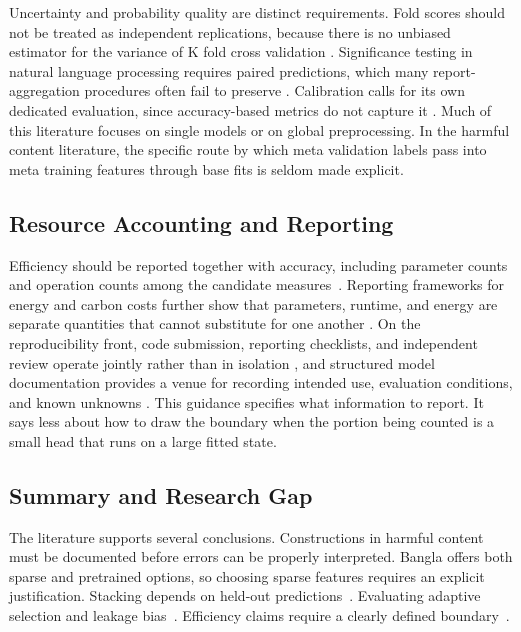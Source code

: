 \documentclass[runningheads]{llncs}
\begin{document}
Uncertainty and probability quality are distinct requirements. Fold scores should not be treated as independent replications, because there is no unbiased estimator for the variance of K fold cross validation . Significance testing in natural language processing requires paired predictions, which many report-aggregation procedures often fail to preserve . Calibration calls for its own dedicated evaluation, since accuracy-based metrics do not capture it . Much of this literature focuses on single models or on global preprocessing. In the harmful content literature, the specific route by which meta validation labels pass into meta training features through base fits is seldom made explicit.

\subsection{Resource Accounting and Reporting}
\label{sec:rw-accounting}

Efficiency should be reported together with accuracy, including parameter counts and operation counts among the candidate measures~\cite{schwartz2020greenai}. Reporting frameworks for energy and carbon costs further show that parameters, runtime, and energy are separate quantities that cannot substitute for one another . On the reproducibility front, code submission, reporting checklists, and independent review operate jointly rather than in isolation , and structured model documentation provides a venue for recording intended use, evaluation conditions, and known unknowns . This guidance specifies what information to report. It says less about how to draw the boundary when the portion being counted is a small head that runs on a large fitted state.

\subsection{Summary and Research Gap}
\label{sec:rw-summary}

The literature supports several conclusions. Constructions in harmful content must be documented before errors can be properly interpreted. Bangla offers both sparse and pretrained options, so choosing sparse features requires an explicit justification. Stacking depends on held-out predictions~\cite{wolpert1992stacked}. Evaluating adaptive selection and leakage bias~\cite{varma2006bias,cawley2010overfitting,kapoor2023leakage}. Efficiency claims require a clearly defined boundary~\cite{schwartz2020greenai}.
\end{document}
